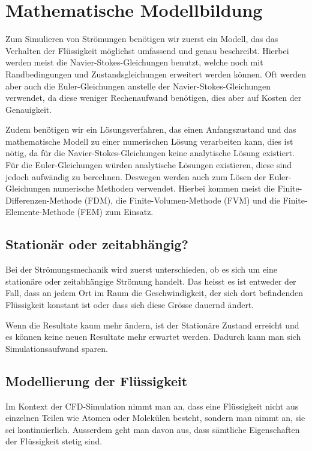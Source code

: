 %
%
%
%
\section{Mathematische Modellbildung
\label{openfoam:section:teil1}}
Zum Simulieren von Strömungen benötigen wir zuerst ein Modell, das das Verhalten der Flüssigkeit möglichst umfassend und genau beschreibt. 
Hierbei werden meist die Navier-Stokes-Gleichungen benutzt, welche noch mit Randbedingungen und Zustandsgleichungen erweitert werden können. 
Oft werden aber auch die Euler-Gleichungen anstelle der Navier-Stokes-Gleichungen verwendet, da diese weniger Rechenaufwand benötigen,
dies aber auf Kosten der Genauigkeit.

Zudem benötigen wir ein Lösungsverfahren, das einen Anfangszustand und das mathematische Modell zu einer numerischen Lösung verarbeiten kann, dies ist nötig, da für die Navier-Stokes-Gleichungen keine analytische Lösung existiert.
Für die Euler-Gleichungen würden analytische Lösungen existieren, diese sind jedoch aufwändig zu berechnen.
Deswegen werden auch zum Lösen der Euler-Gleichungen numerische Methoden verwendet.
Hierbei kommen meist die Finite-Differenzen-Methode (FDM), die Finite-Volumen-Methode (FVM) und die Finite-Elemente-Methode (FEM) zum Einsatz. 

\subsection{Stationär oder zeitabhängig?}
Bei der Strömungsmechanik wird zuerst unterschieden, ob es sich um eine stationäre oder zeitabhängige Strömung handelt.
Das heisst es ist entweder der Fall, dass an jedem Ort im Raum die Geschwindigkeit, der sich dort befindenden Flüssigkeit  konstant ist oder dass sich diese Grösse dauernd ändert.

Wenn die Resultate kaum mehr ändern, ist der Stationäre Zustand erreicht und es können keine neuen Resultate mehr erwartet werden.
Dadurch kann man sich Simulationsaufwand sparen.

\subsection{Modellierung der Flüssigkeit}
Im Kontext der CFD-Simulation nimmt man an, dass eine Flüssigkeit nicht aus einzelnen Teilen wie Atomen oder Molekülen besteht, sondern man nimmt an, sie sei kontinuierlich. 
Ausserdem geht man davon aus, dass sämtliche Eigenschaften der Flüssigkeit stetig sind. 

